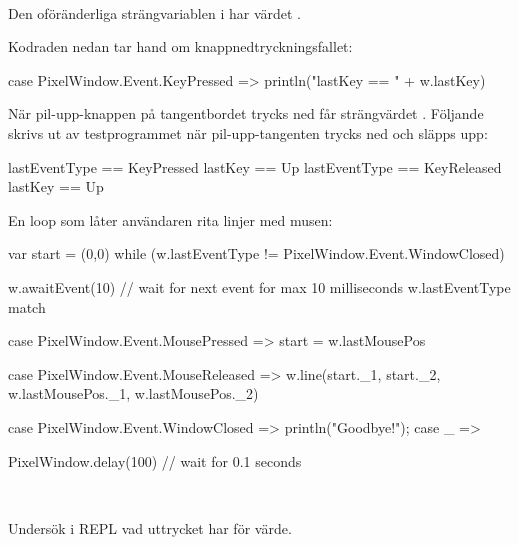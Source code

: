 \SOLUTION

\TaskSolved \what~

\SubtaskSolved Den oföränderliga strängvariablen  i  har värdet .

\SubtaskSolved Kodraden nedan tar hand om knappnedtryckningsfallet:
\begin{Code}
case PixelWindow.Event.KeyPressed => println("lastKey == " + w.lastKey)
\end{Code}

\SubtaskSolved När pil-upp-knappen på tangentbordet trycks ned får  strängvärdet . Följande skrivs ut av testprogrammet när pil-upp-tangenten trycks ned och släpps upp:
\begin{REPL}
lastEventType == KeyPressed
lastKey == Up
lastEventType == KeyReleased
lastKey == Up
\end{REPL}


\SubtaskSolved En loop som låter användaren rita linjer med musen:
\begin{Code}
var start = (0,0)
while (w.lastEventType != PixelWindow.Event.WindowClosed) {
  w.awaitEvent(10)  // wait for next event for max 10 milliseconds
  w.lastEventType match {
    case PixelWindow.Event.MousePressed  =>
      start = w.lastMousePos

    case PixelWindow.Event.MouseReleased =>
      w.line(start._1, start._2, w.lastMousePos._1, w.lastMousePos._2)

    case PixelWindow.Event.WindowClosed  =>
       println("Goodbye!");
    case _ =>
  }
  PixelWindow.delay(100) // wait for 0.1 seconds
}
\end{Code}

\QUESTEND


\clearpage

\ExtraTasks %




\QUESTBEGIN

\Task  \what~

\Subtask Undersök i REPL vad uttrycket  har för värde.

